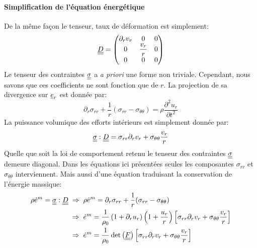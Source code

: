\documentclass[10pt]{book}
\begin{document}
\paragraph{Simplification de l'équation énergétique}
De la même façon le tenseur, taux de déformation est simplement:
$$\underline{\underline{D}}=\begin{pmatrix}
\partial_{r}v_{r} & 0 & 0\\
0 & \dfrac{v_{r}}{r} & 0\\
0 & 0 & 0
\end{pmatrix}$$
Le tenseur des contraintes  $\underline{\underline{\sigma}}$ a \emph{a priori} une forme non triviale. Cependant, nous savons que ces coefficients ne sont fonction que de $r$. La projection de sa divergence sur $\underline{e}_{r}$ est donnée par:
$$\partial_{r}\sigma_{rr}+\frac{1}{r}(\sigma_{rr}-\sigma_{\theta\theta})=\rho\dfrac{\partial^{2}u_{r}}{\partial t^{2}}$$
La puissance volumique des efforts intérieurs est simplement donnée par:
$$\underline{\underline{\sigma}}:\underline{\underline{D}}=\sigma_{rr}\partial_{r}v_{r}+\sigma_{\theta\theta}\dfrac{v_{r}}{r}$$
Quelle que soit la loi de comportement retenu le tenseur des contraintes $\underline{\underline{\sigma}}$ demeure diagonal. Dans les équations ici présentées seules les composantes $\sigma_{rr}$ et $\sigma_{\theta\theta}$ interviennent. 
Mais aussi d'une équation traduisant la conservation de l'énergie massique:
$$\begin{aligned}
\rho\dot{e}^{m}=\underline{\underline{\sigma}}:\underline{\underline{D}} &\; \Rightarrow \; \rho\dot{e}^{m}=\partial_{r}\sigma_{rr}+\frac{1}{r}(\sigma_{rr}-\sigma_{\theta\theta})\\
&\; \Rightarrow \; \dot{e}^{m}=\dfrac{1}{\rho_{0}}\left(1+\partial_{r}u_{r}\right)\left(1+\frac{u_{r}}{r}\right)\left[\sigma_{rr}\partial_{r}v_{r}+\sigma_{\theta\theta}\dfrac{v_{r}}{r}\right]\\
&\; \Rightarrow \; \dot{e}^{m}=\dfrac{1}{\rho_{0}}\det\left(\underline{\underline{F}}\right)\left[\sigma_{rr}\partial_{r}v_{r}+\sigma_{\theta\theta}\dfrac{v_{r}}{r}\right]\\
\end{aligned}$$
\end{document}
